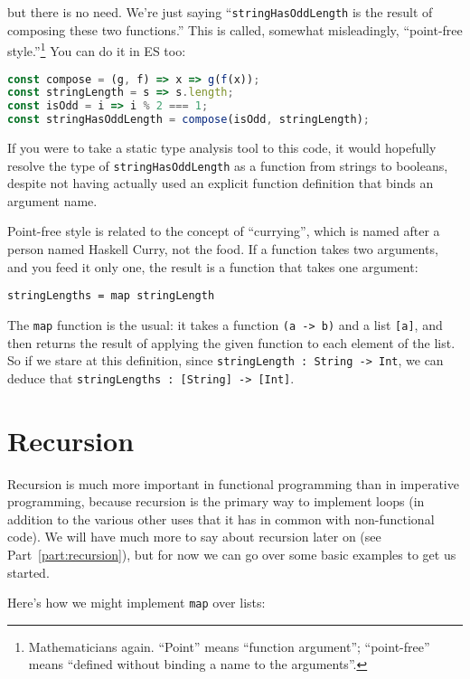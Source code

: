 \documentclass{book}
\newcommand{\mlil}[1]{\lstinline[language=pseudoml,columns=fixed]|#1|}\usepackage{caption}
\begin{document}
\noindent but there is no need. We're just saying ``\mlil{stringHasOddLength} is the result of composing these two functions.'' This is called, somewhat misleadingly, ``point-free style.''\footnote{Mathematicians again. ``Point'' means ``function argument''; ``point-free'' means ``defined without binding a name to the arguments''.} You can do it in ES too:

\begin{lstlisting}[language=js]
const compose = (g, f) => x => g(f(x));
const stringLength = s => s.length;
const isOdd = i => i % 2 === 1;
const stringHasOddLength = compose(isOdd, stringLength);
\end{lstlisting}

If you were to take a static type analysis tool to this code, it would hopefully resolve the type of \mlil{stringHasOddLength} as a function from strings to booleans, despite not having actually used an explicit function definition that binds an argument name.

Point-free style is related to the concept of ``currying'', which is named after a person named Haskell Curry, not the food. If a function takes two arguments, and you feed it only one, the result is a function that takes one argument:

\begin{lstlisting}[language=pseudoml]
stringLengths = map stringLength
\end{lstlisting}

The \mlil{map} function is the usual: it takes a function \mlil{(a -> b)} and a list \mlil{[a]}, and then returns the result of applying the given function to each element of the list. So if we stare at this definition, since \mlil{stringLength : String -> Int}, we can deduce that \mlil{stringLengths : [String] -> [Int]}.

\section{Recursion}\label{sec:recursion}

Recursion is much more important in functional programming than in imperative programming, because recursion is the primary way to implement loops (in addition to the various other uses that it has in common with non-functional code). We will have much more to say about recursion later on (see Part~\ref{part:recursion}), but for now we can go over some basic examples to get us started.

Here's how we might implement \mlil{map} over lists:
\end{document}

